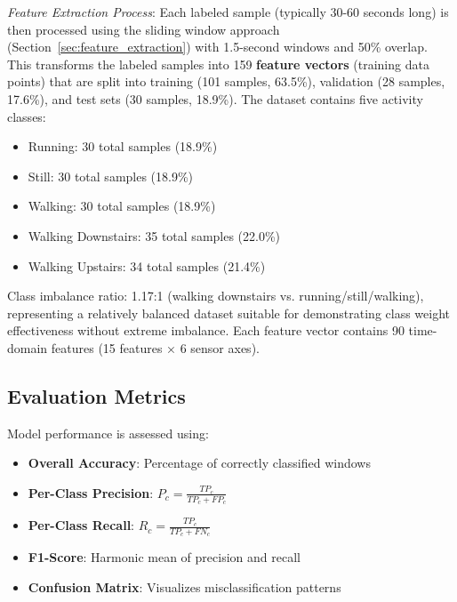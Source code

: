 \textit{Feature Extraction Process}: Each labeled sample (typically 30-60 seconds long) is then processed using the sliding window approach (Section~\ref{sec:feature_extraction}) with 1.5-second windows and 50\% overlap. This transforms the labeled samples into 159 \textbf{feature vectors} (training data points) that are split into training (101 samples, 63.5\%), validation (28 samples, 17.6\%), and test sets (30 samples, 18.9\%). The dataset contains five activity classes:
\begin{itemize}
    \item Running: 30 total samples (18.9\%)
    \item Still: 30 total samples (18.9\%)
    \item Walking: 30 total samples (18.9\%)
    \item Walking Downstairs: 35 total samples (22.0\%)
    \item Walking Upstairs: 34 total samples (21.4\%)
\end{itemize}
Class imbalance ratio: 1.17:1 (walking downstairs vs. running/still/walking), representing a relatively balanced dataset suitable for demonstrating class weight effectiveness without extreme imbalance. Each feature vector contains 90 time-domain features (15 features × 6 sensor axes).

\subsection{Evaluation Metrics}
Model performance is assessed using:
\begin{itemize}
    \item \textbf{Overall Accuracy}: Percentage of correctly classified windows
    \item \textbf{Per-Class Precision}: $P_c = \frac{TP_c}{TP_c + FP_c}$
    \item \textbf{Per-Class Recall}: $R_c = \frac{TP_c}{TP_c + FN_c}$
    \item \textbf{F1-Score}: Harmonic mean of precision and recall
    \item \textbf{Confusion Matrix}: Visualizes misclassification patterns
\end{itemize}

